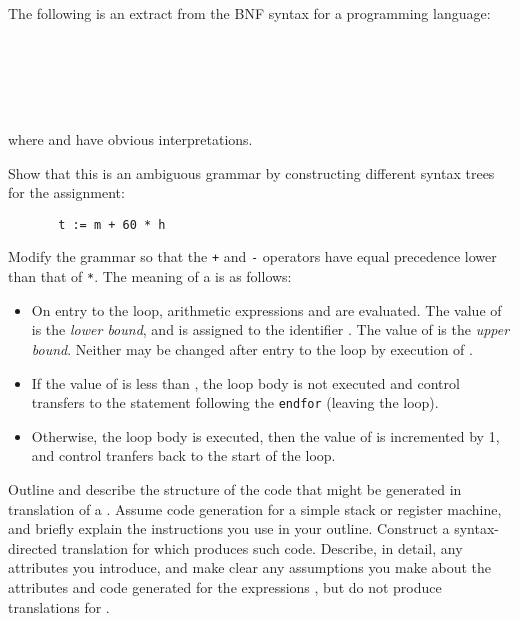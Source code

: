 
\question


The following is an extract from the BNF syntax for
a programming language:
\begin{bnf}
 \\
 \\
 \\
 \\
\end{bnf}
where  and  have obvious interpretations.
\begin{subquestions}
\subsubquestion
Show that this is an ambiguous grammar by constructing different
syntax trees for the assignment:
\begin{verbatim}
       t := m + 60 * h
\end{verbatim}
\subquestion
Modify the grammar so that the \verb"+" and \verb"-" operators
have equal precedence lower than that of \verb"*".
\subquestion
The meaning of a  is as follows:
\begin{itemize}
\item On entry to the loop, arithmetic expressions  and 
        are evaluated. The value of  is the {\em lower
        bound}, and is assigned to the identifier .
        The value of  is the {\em upper bound}.
        Neither may be changed after entry to the loop by 
        execution of .
\item If the value of  is less than ,
        the loop body  is
        not executed and control transfers to the statement following
        the \verb"endfor" (leaving the loop).
\item Otherwise, the loop body  is
        executed,  
        then the value of  is incremented by 1,
        and control tranfers back to the start of the loop.
\end{itemize}
\begin{subsubquestions}
\subsubquestion
	Outline and describe the structure of the
        code that might be generated in translation of
        a .  Assume code generation for a simple
        stack or register machine, and briefly explain the
	instructions you use in your outline.
\subsubquestion
        Construct a syntax-directed translation for 
         which produces such code.
        Describe, in detail, any attributes you
        introduce, and make clear any assumptions you make about 
        the attributes and code generated for the
        expressions , but do not produce translations for
	.
\end{subsubquestions}
\end{subquestions}


